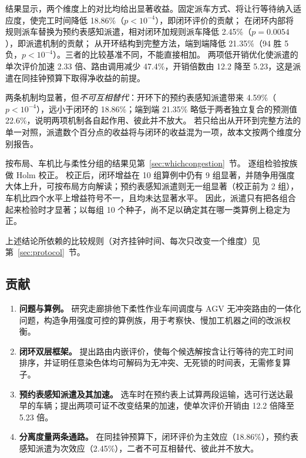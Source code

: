\documentclass[manuscript,screen,review]{acmart}
\newcommand{\NCases}{10}
\newcommand{\NSeeds}{10}
\newcommand{\GainLoopRule}{18.86\%}      %
\newcommand{\PLoopRule}{<10^{-4}}
\newcommand{\GainProbeOpen}{4.59\%}      %
\newcommand{\PProbeOpen}{<10^{-4}}
\newcommand{\GainProbeLoop}{2.45\%}      %
\newcommand{\PProbeLoop}{=0.0054}
\newcommand{\GainEndToEnd}{21.35\%}      %
\newcommand{\PEndToEnd}{<10^{-4}}
\newcommand{\WinEndToEnd}{94}
\newcommand{\LoseEndToEnd}{5}
\newcommand{\GainIndepProduct}{22.6\%}
\newcommand{\CellsSigLoopAdj}{9}
\newcommand{\CellsSigProbe}{2}
\newcommand{\SpeedupProbe}{2.33}
\newcommand{\RouteCallCut}{47.4\%}
\newcommand{\CostMultBefore}{12.2}
\newcommand{\CostMultAfter}{5.23}
\begin{document}
结果显示，两个维度上的对比均给出显著收益。固定派车方式、将让行等待纳入适应度，使完工时间降低 \GainLoopRule{}（$p\PLoopRule$），即闭环评价的贡献；
在闭环内部将规则派车替换为预约表感知派遣，相对闭环加规则派车降低 \GainProbeLoop{}（$p\PProbeLoop$），即派遣机制的贡献；
从开环结构到完整方法，端到端降低 \GainEndToEnd{}（\WinEndToEnd{} 胜 \LoseEndToEnd{} 负，$p\PEndToEnd$）。三者的比较基准不同，不能直接相加。
两项低开销优化使派遣的单次评价加速 \SpeedupProbe{} 倍、路由调用减少 \RouteCallCut{}，开销倍数由 \CostMultBefore{} 降至 \CostMultAfter{}，这是派遣在同挂钟预算下取得净收益的前提。

两条机制均显著，但\emph{不可互相替代}：开环下的预约表感知派遣带来 \GainProbeOpen{}（$p\PProbeOpen$），远小于闭环的 \GainLoopRule{}；端到端 \GainEndToEnd{} 略低于两者独立复合的预测值 \GainIndepProduct{}，说明两项机制各自起作用、彼此并不放大。
若只给出从开环到完整方法的单一对照，派遣数个百分点的收益将与闭环的收益混为一项，故本文按两个维度分别报告。

按布局、车机比与柔性分组的结果见第~\ref{sec:whichcongestion}~节。
逐组检验按族做 Holm 校正。
校正后，闭环增益在 \NCases{} 组算例中仍有 \CellsSigLoopAdj{} 组显著，并随争用强度大体上升，可按布局方向解读；预约表感知派遣则无一组显著（校正前为 \CellsSigProbe{} 组），车机比四个水平上增益符号不一，且均未达显著水平。
因此，派遣只有把各组合起来检验时才显著；以每组 \NSeeds{} 个种子，尚不足以确定其在哪一类算例上稳定为正。

上述结论所依赖的比较规则（对齐挂钟时间、每次只改变一个维度）见第~\ref{sec:protocol}~节。

\subsection{贡献}

\begin{enumerate}[leftmargin=*]

\item \textbf{问题与算例。} 研究走廊排他下柔性作业车间调度与 AGV 无冲突路由的一体化问题，构造争用强度可控的算例族，用于考察快、慢加工机器之间的改派权衡。

\item \textbf{闭环双层框架。} 提出路由内嵌评价，使每个候选解按含让行等待的完工时间排序，并证明任意染色体均可解码为无冲突、无死锁的时间表，无需修复算子。

\item \textbf{预约表感知派遣及其加速。} 选车时在预约表上试算两段运输，选可行送达最早的车辆；提出两项可证不改变结果的加速，使单次评价开销由 \CostMultBefore{} 倍降至 \CostMultAfter{} 倍。

\item \textbf{分离度量两条通路。} 在同挂钟预算下，闭环评价为主效应（\GainLoopRule{}），预约表感知派遣为次效应（\GainProbeLoop{}），二者不可互相替代、彼此并不放大。


\end{enumerate}
\end{document}
